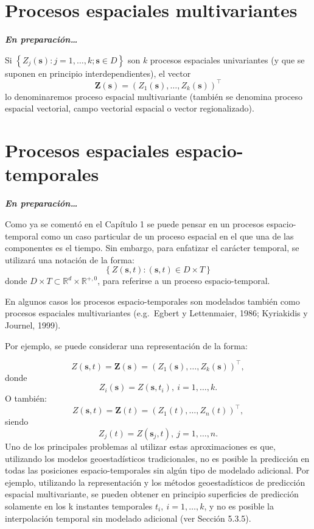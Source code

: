 \documentclass[
  spanish,
]{book}
\theoremstyle{break}
\theoremstyle{definition}
\theoremstyle{definition}
\theoremstyle{definition}
\theoremstyle{definition}
\theoremstyle{remark}
\begin{document}
\hypertarget{multivar}{%
\chapter{Procesos espaciales multivariantes}\label{multivar}}

\textbf{\emph{En preparación\ldots{}}}

Si \(\left\{ Z_{j}(\mathbf{s}):j=1, \ldots, k;\mathbf{s}\in D\right\}\)
son \(k\) procesos espaciales univariantes (y que se suponen en principio interdependientes), el vector
\[\mathbf{Z}(\mathbf{s})=(Z_{1}(\mathbf{s}), \ldots, Z_{k}(\mathbf{s}))^\top\]
lo denominaremos proceso espacial multivariante (también se denomina proceso espacial vectorial, campo vectorial espacial o vector regionalizado).

\hypertarget{esp-temp}{%
\chapter{Procesos espaciales espacio-temporales}\label{esp-temp}}

\textbf{\emph{En preparación\ldots{}}}

Como ya se comentó en el Capítulo 1 se puede pensar en un procesos espacio-temporal como un caso particular de un proceso espacial en el que una de las componentes es el tiempo.
Sin embargo, para enfatizar el carácter temporal, se utilizará una notación de la forma:
\[\left\{ Z(\mathbf{s},t):(\mathbf{s},t)\in D\times T\right\}\]
donde \(D\times T\subset \mathbb{R} ^{d} \times \mathbb{R}^{+,0}\), para
referirse a un proceso espacio-temporal.

En algunos casos los procesos espacio-temporales son modelados también
como procesos espaciales multivariantes (e.g.~Egbert y Lettenmaier,
1986; Kyriakidis y Journel, 1999).

Por ejemplo, se puede considerar una representación de la forma:

\[Z(\mathbf{s},t)=\mathbf{Z}(\mathbf{s})=(Z_{1} (\mathbf{s}), \ldots,Z_{k} (
\mathbf{s}))^\top,\]
donde
\[Z_{i} (\mathbf{s})=Z(\mathbf{s},t_{i} ),\  i=1, \ldots,k.\]
O también:
\[Z(\mathbf{s},t) = \mathbf{Z}(t) =  \left(Z_{1}(t), \ldots, Z_{n}(t) \right)^\top,\]
siendo
\[Z_{j} (t)=Z(\mathbf{s}_{j} ,t),\  j=1, \ldots,n.\]
Uno de los principales problemas al utilizar estas aproximaciones es que, utilizando los modelos geoestadísticos tradicionales, no es posible la
predicción en todas las posiciones espacio-temporales sin algún tipo de
modelado adicional. Por ejemplo, utilizando la representación y los métodos geoestadísticos de predicción espacial multivariante, se pueden obtener en principio superficies de predicción solamente en los k instantes temporales \(t_{i} ,\  i=1, \ldots, k\),
y no es posible la interpolación temporal sin modelado adicional (ver Sección 5.3.5).
\end{document}
